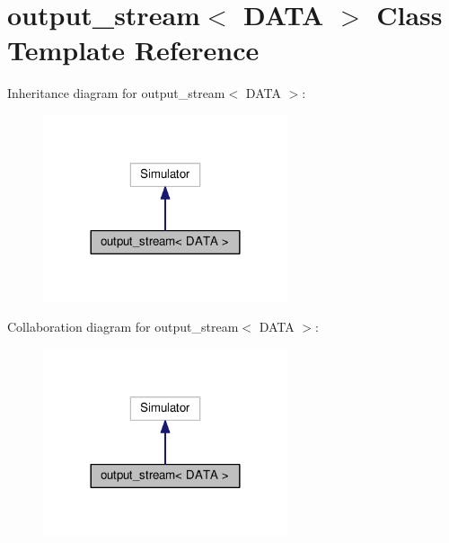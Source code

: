 \hypertarget{classoutput__stream}{}\section{output\+\_\+stream$<$ D\+A\+TA $>$ Class Template Reference}
\label{classoutput__stream}


Inheritance diagram for output\+\_\+stream$<$ D\+A\+TA $>$\+:
\nopagebreak
\begin{figure}[H]
\begin{center}
\leavevmode
\includegraphics[width=204pt]{classoutput__stream__inherit__graph}
\end{center}
\end{figure}


Collaboration diagram for output\+\_\+stream$<$ D\+A\+TA $>$\+:
\nopagebreak
\begin{figure}[H]
\begin{center}
\leavevmode
\includegraphics[width=204pt]{classoutput__stream__coll__graph}
\end{center}
\end{figure}
